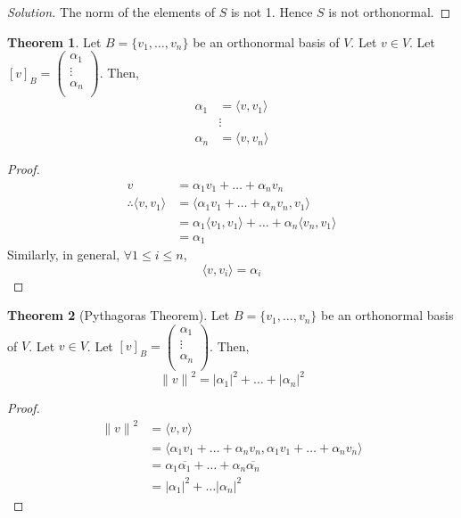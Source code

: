 \documentclass[fleqn, a4paper, 12pt]{article}
\theoremstyle{definition}
\theoremstyle{theorem}
\newtheorem{theorem}{Theorem} %
\theoremstyle{remark}
\newenvironment{solution} %
	{\begin{proof}[Solution]\let\qed\relax}
	{\end{proof}}
\numberwithin{corollary}{theorem}
\numberwithin{equation}{theorem}
\begin{document}
\begin{solution}
	The norm of the elements of $S$ is not 1. Hence $S$ is not orthonormal.
\end{solution}

\begin{theorem}
	Let $B = \{v_1, \dots, v_n\}$ be an orthonormal basis of $V$. Let $v \in V$. Let $[v]_B = 
		\begin{pmatrix}
			\alpha_1\\
			\vdots\\
			\alpha_n\\
		\end{pmatrix}
		$.
	Then,
	\begin{align*}
		\alpha_1 &= \langle v, v_1 \rangle\\
		&\vdots\\
		\alpha_n &= \langle v, v_n \rangle
	\end{align*}
\end{theorem}

\begin{proof}
	\begin{align*}
		v &= \alpha_1 v_1 + \dots + \alpha_n v_n\\
		\therefore \langle v, v_1 \rangle &= \langle \alpha_1 v_1 + \dots + \alpha_n v_n, v_1 \rangle\\
		&= \alpha_1 \langle v_1, v_1 \rangle + \dots + \alpha_n \langle v_n, v_1 \rangle\\
		&= \alpha_1
	\end{align*}
	Similarly, in general, $\forall 1 \leq i \leq n$,
	\begin{equation*}
		\langle v, v_i \rangle = \alpha_i
	\end{equation*}
\end{proof}

\begin{theorem}[Pythagoras Theorem]\label{Pythagoras Theorem}
	Let $B = \{v_1, \dots, v_n\}$ be an orthonormal basis of $V$. Let $v \in V$. Let $[v]_B = 
		\begin{pmatrix}
			\alpha_1\\
			\vdots\\
			\alpha_n\\
		\end{pmatrix}
		$.
	Then,
	\begin{equation*}
		{\| v \|}^2 = |\alpha_1|^2 + \dots + |\alpha_n|^2
	\end{equation*}
\end{theorem}

\begin{proof}
	\begin{align*}
		{\| v \|}^2 &= \langle v, v \rangle\\
		&= \langle \alpha_1 v_1 + \dots + \alpha_n v_n, \alpha_1 v_1 + \dots + \alpha_n v_n \rangle\\
		&= \alpha_1 \overline{\alpha_1} + \dots + \alpha_n \overline{\alpha_n}\\
		&= |\alpha_1|^2 + \dots |\alpha_n|^2
	\end{align*}
\end{proof}
\end{document}
